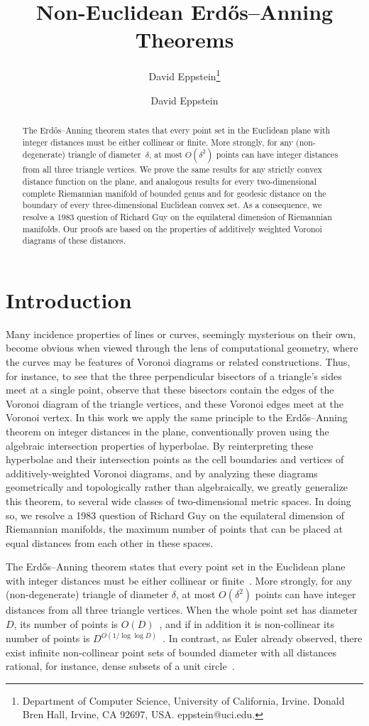 \documentclass[11pt]{article}
\title{Non-Euclidean Erd\H{o}s--Anning Theorems}
\author{David Eppstein\thanks{Department of Computer Science, University of California, Irvine. Donald Bren Hall, Irvine, CA 92697, USA. eppstein@uci.edu.}}
\author{David Eppstein}{University of California, Irvine \and\url{https://www.ics.uci.edu/~eppstein/}}{eppstein@uci.edu}{}{Research supported in part by NSF grant CCF-2212129.}
\theoremstyle{definition}
\begin{document}
\maketitle
\begin{abstract}
The Erd\H{o}s--Anning theorem states that every point set in the Euclidean plane with integer distances must be either collinear or finite. More strongly, for any (non-degenerate) triangle of diameter~$\delta$, at most $O(\delta^2)$ points can have integer distances from all three triangle vertices. We prove the same results for any strictly convex distance function on the plane, and analogous results for every two-dimensional complete Riemannian manifold of bounded genus and for geodesic distance on the boundary of every three-dimensional Euclidean convex set. As a consequence, we resolve a 1983 question of Richard Guy on the equilateral dimension of Riemannian manifolds. Our proofs are based on the properties of additively weighted Voronoi diagrams of these distances.
\end{abstract}

\section{Introduction}

Many incidence properties of lines or curves, seemingly mysterious on their own, become obvious when viewed through the lens of computational geometry, where the curves may be features of Voronoi diagrams or related constructions. Thus, for instance, to see that the three perpendicular bisectors of a triangle's sides meet at a single point, observe that these bisectors contain the edges of the Voronoi diagram of the triangle vertices, and these Voronoi edges meet at the Voronoi vertex. In this work we apply the same principle to the Erd\H{o}s--Anning theorem on integer distances in the plane, conventionally proven using the algebraic intersection properties of hyperbolae. By reinterpreting these hyperbolae and their intersection points as the cell boundaries and vertices of additively-weighted Voronoi diagrams, and by analyzing these diagrams geometrically and topologically rather than algebraically, we greatly generalize this theorem, to several wide classes of two-dimensional metric spaces. In doing so, we resolve a 1983 question of Richard Guy on the equilateral dimension of Riemannian manifolds, the maximum number of points that can be placed at equal distances from each other in these spaces.

The Erd\H{o}s--Anning theorem states that every point set in the Euclidean plane with integer distances must be either collinear or finite~\cite{AnnErd-BAMS-45,Erd-BAMS-45}. More strongly, for any (non-degenerate) triangle of diameter $\delta$, at most $O(\delta^2)$ points can have integer distances from all three triangle vertices. When the whole point set has diameter $D$, its number of points is $O(D)$~\cite{Sol-DCG-03}, and if in addition it is non-collinear its number of points is $D^{O(1/\log\log D)}$~\cite{GreIliPel-24}. In contrast, as Euler already observed, there exist infinite non-collinear point sets of bounded diameter with all distances rational, for instance, dense subsets of a unit circle~\cite{Eul-FxA-62,Har-CH-98}. 
\end{document}
